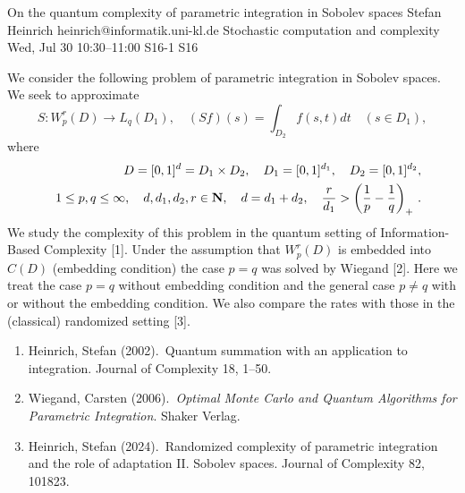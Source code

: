 \documentclass[12pt,lettersize,oneside]{book} %
\begin{document}
\begin{talk}
  {On the quantum complexity of parametric integration in Sobolev spaces}%
  {Stefan Heinrich}%
  {heinrich@informatik.uni-kl.de}%
  {Stochastic computation and complexity}%
  {}%
  {}%
  {Wed, Jul 30 10:30--11:00}%
  {S16-1}%
  {S16}%
    
   
We consider the following problem of parametric integration in Sobolev spaces. We seek to approximate
$$
S:W_p^r(D)\to L_q(D_1), \quad (Sf)(s)=\int_{D_2}f(s,t)dt \quad (s\in D_1),
$$ 
where 
%
\begin{eqnarray*}
&&D=[0,1]^d=D_1\times D_2,\quad D_1=[0,1]^{d_1}, \quad D_2=[0,1]^{d_2}, 
\\
&&1\le p,q\le \infty, \quad d,d_1,d_2,r\in {\bf N},\quad d=d_1+d_2,\quad \frac{r}{d_1}>\left(\frac{1}{p}-\frac{1}{q}\right)_+\, .
\end{eqnarray*}
%
We study the complexity of this problem in the quantum setting of Information-Based Complexity [1]. Under the assumption that $W_p^r(D)$ is embedded into $C(D)$ (embedding condition) the case $p=q$ was solved by Wiegand [2]. Here we treat the case $p=q$ without embedding condition and the general case $p\ne q$ with or without the embedding condition. We also compare the rates with those in the (classical) randomized setting [3].


\medskip

\begin{enumerate}

\item[{[1]}] Heinrich, Stefan (2002).\  Quantum summation with an application to integration. 
Journal of Complexity 18, 1--50.
\item[{[2]}] Wiegand, Carsten (2006).\ {\it Optimal Monte Carlo and Quantum Algorithms for Parametric Integration}. Shaker Verlag.
\item[{[3]}] Heinrich, Stefan (2024).\  Randomized complexity of parametric integration and
the role of adaptation  II. Sobolev spaces. Journal of Complexity 82, 101823.
\end{enumerate}

\end{talk}
\end{document}
